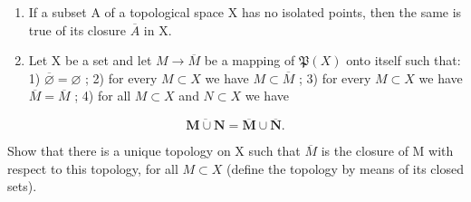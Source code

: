 \begin{enumerate}
\def\labelenumi{\arabic{enumi})}
\setcounter{enumi}{7}
\item
  If a subset A of a topological space X has no isolated points, then the same is true of its closure \(\overline{A}\) in X.
\item
  Let X be a set and let \(M \to \overline{M}\) be a mapping of \(\mathfrak{P}(X)\) onto itself such that: 1) \(\overline{\varnothing} = \varnothing\) ; 2) for every \(M \subset X\) we have \(M \subset \overline{M}\) ; 3) for every \(M \subset X\) we have \(\overline{M} = \overline{M}\) ; 4) for all \(M \subset X\) and \(N \subset X\) we have
\end{enumerate}

\[
\overline {{\mathbf {M} \cup \mathbf {N}}} = \overline {{\mathbf {M}}} \cup \overline {{\mathbf {N}}}.
\]

Show that there is a unique topology on X such that \(\overline{M}\) is the closure of M with respect to this topology, for all \(M \subset X\) (define the topology by means of its closed sets).

